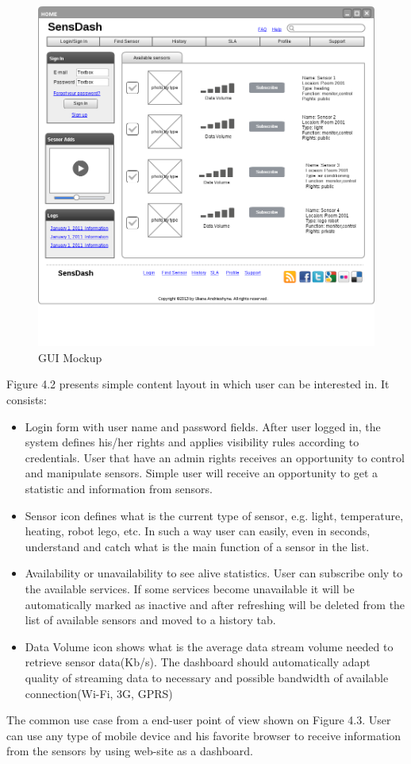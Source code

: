     \begin{figure}[!ht]
    \centering
    \includegraphics[scale=0.4]{images/Mockup.png}   
    \caption[GUI Mockup]{GUI Mockup}
    \label{img:GUI Mockup}                           
    \end{figure}
    Figure 4.2 presents simple content layout in which user can be interested in. It consists:
      \begin{itemize}
      \item Login form with user name and password fields. After user logged in, the system defines his/her rights and applies visibility rules according to credentials. User that have an admin rights receives an opportunity to control and manipulate sensors. Simple user will receive an opportunity to get a statistic and information from sensors.
      \item Sensor icon defines what is the current type of sensor, e.g. light, temperature, heating, robot lego, etc. In such a way user can easily, even in seconds, understand and catch what is the main function of a sensor in the list.
      \item Availability or unavailability to see alive statistics. User can subscribe only to the available services. If some services become unavailable it will be automatically marked as inactive and after refreshing will be deleted from the list of available sensors and moved to a history tab.
      \item Data Volume icon shows what is the average data stream volume needed to retrieve sensor data(Kb/s). The dashboard should automatically adapt quality of streaming data to necessary and possible bandwidth of available connection(Wi-Fi, 3G, GPRS)
      \end{itemize}
    The common use case from a end-user point of view shown on Figure 4.3. User can use any type of mobile device and his favorite browser to receive information from the sensors by using web-site as a dashboard.


